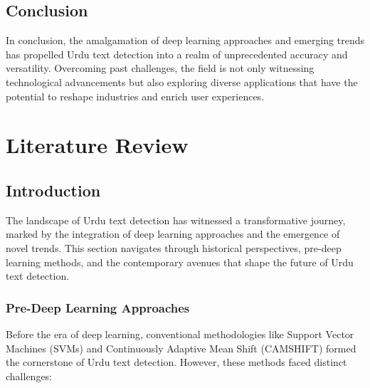 \documentclass[default,iicol]{sn-jnl}%
\begin{document}
\subsection{Conclusion}

In conclusion, the amalgamation of deep learning approaches and emerging trends has propelled Urdu text detection into a realm of unprecedented accuracy and versatility. Overcoming past challenges, the field is not only witnessing technological advancements but also exploring diverse applications that have the potential to reshape industries and enrich user experiences.


	
	\section{Literature Review}
	
	\subsection{Introduction}
	
	The landscape of Urdu text detection has witnessed a transformative journey, marked by the integration of deep learning approaches and the emergence of novel trends. This section navigates through historical perspectives, pre-deep learning methods, and the contemporary avenues that shape the future of Urdu text detection.
	
	\subsubsection{Pre-Deep Learning Approaches}
	
	Before the era of deep learning, conventional methodologies like Support Vector Machines (SVMs) and Continuously Adaptive Mean Shift (CAMSHIFT) formed the cornerstone of Urdu text detection. However, these methods faced distinct challenges:
	
\end{document}
